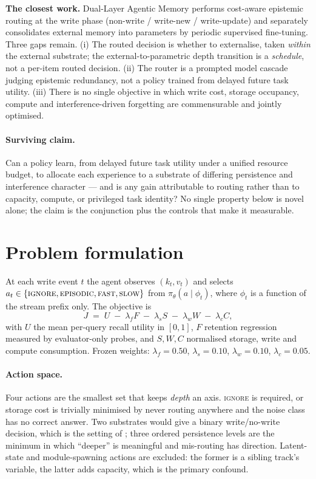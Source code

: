\documentclass[11pt]{article}
\begin{document}
\textbf{The closest work.} Dual-Layer Agentic Memory \cite{li2026duallayer}
performs cost-aware epistemic routing at the write phase (non-write /
write-new / write-update) and separately consolidates external memory into
parameters by periodic supervised fine-tuning. Three gaps remain. (i) The routed
decision is whether to externalise, taken \emph{within} the external substrate;
the external-to-parametric depth transition is a \emph{schedule}, not a per-item
routed decision. (ii) The router is a prompted model cascade judging epistemic
redundancy, not a policy trained from delayed future task utility. (iii) There
is no single objective in which write cost, storage occupancy, compute and
interference-driven forgetting are commensurable and jointly optimised.

\paragraph{Surviving claim.} Can a policy learn, from delayed future task
utility under a unified resource budget, to allocate each experience to a
substrate of differing persistence and interference character --- and is any
gain attributable to routing rather than to capacity, compute, or privileged
task identity? No single property below is novel alone; the claim is the
conjunction plus the controls that make it measurable.

\section{Problem formulation}

At each write event $t$ the agent observes $(k_t, v_t)$ and selects
$a_t \in \{\textsc{ignore}, \textsc{episodic}, \textsc{fast}, \textsc{slow}\}$
from $\pi_\theta(a \mid \phi_t)$, where $\phi_t$ is a function of the stream
prefix only. The objective is
\begin{equation}
J \;=\; U \;-\; \lambda_f F \;-\; \lambda_s S \;-\; \lambda_w W \;-\; \lambda_c C,
\label{eq:objective}
\end{equation}
with $U$ the mean per-query recall utility in $[0,1]$, $F$ retention regression
measured by evaluator-only probes, and $S, W, C$ normalised storage, write and
compute consumption. Frozen weights: $\lambda_f = 0.50$, $\lambda_s = 0.10$,
$\lambda_w = 0.10$, $\lambda_c = 0.05$.

\paragraph{Action space.} Four actions are the smallest set that keeps
\emph{depth} an axis. \textsc{ignore} is required, or storage cost is trivially
minimised by never routing anywhere and the noise class has no correct answer.
Two substrates would give a binary write/no-write decision, which is the setting
of \cite{yan2025memoryr1,li2026duallayer}; three ordered persistence levels are
the minimum in which ``deeper'' is meaningful and mis-routing has direction.
Latent-state and module-spawning actions are excluded: the former is a sibling
track's variable, the latter adds capacity, which is the primary confound.
\end{document}
